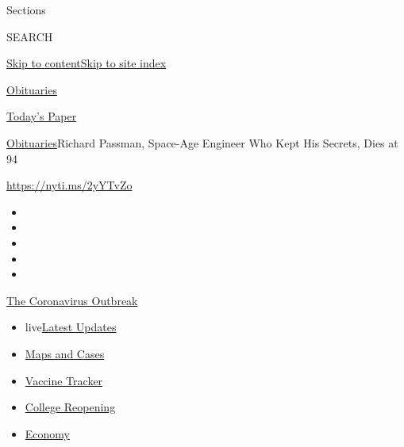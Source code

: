 Sections

SEARCH

\protect\hyperlink{site-content}{Skip to
content}\protect\hyperlink{site-index}{Skip to site index}

\href{https://www.nytimes3xbfgragh.onion/section/obituaries}{Obituaries}

\href{https://myaccount.nytimes3xbfgragh.onion/auth/login?response_type=cookie\&client_id=vi}{}

\href{https://www.nytimes3xbfgragh.onion/section/todayspaper}{Today's
Paper}

\href{/section/obituaries}{Obituaries}\textbar{}Richard Passman,
Space-Age Engineer Who Kept His Secrets, Dies at 94

\url{https://nyti.ms/2yYTvZo}

\begin{itemize}
\item
\item
\item
\item
\item
\end{itemize}

\href{https://www.nytimes3xbfgragh.onion/news-event/coronavirus?action=click\&pgtype=Article\&state=default\&region=TOP_BANNER\&context=storylines_menu}{The
Coronavirus Outbreak}

\begin{itemize}
\tightlist
\item
  live\href{https://www.nytimes3xbfgragh.onion/2020/08/04/world/coronavirus-covid-19.html?action=click\&pgtype=Article\&state=default\&region=TOP_BANNER\&context=storylines_menu}{Latest
  Updates}
\item
  \href{https://www.nytimes3xbfgragh.onion/interactive/2020/us/coronavirus-us-cases.html?action=click\&pgtype=Article\&state=default\&region=TOP_BANNER\&context=storylines_menu}{Maps
  and Cases}
\item
  \href{https://www.nytimes3xbfgragh.onion/interactive/2020/science/coronavirus-vaccine-tracker.html?action=click\&pgtype=Article\&state=default\&region=TOP_BANNER\&context=storylines_menu}{Vaccine
  Tracker}
\item
  \href{https://www.nytimes3xbfgragh.onion/2020/08/02/us/covid-college-reopening.html?action=click\&pgtype=Article\&state=default\&region=TOP_BANNER\&context=storylines_menu}{College
  Reopening}
\item
  \href{https://www.nytimes3xbfgragh.onion/live/2020/08/03/business/stock-market-today-coronavirus?action=click\&pgtype=Article\&state=default\&region=TOP_BANNER\&context=storylines_menu}{Economy}
\end{itemize}

